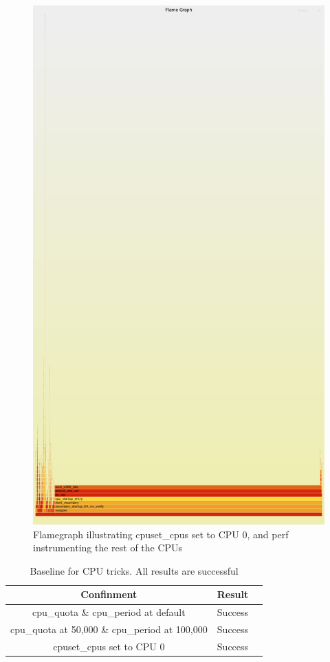 \documentclass{report}  %
\begin{document}
\begin{figure}[H]
    \centering
    \includegraphics[scale=0.2]{cpu_tricks/6.1.0/V1/flamegraph_20241021_080829.png}
    \caption{Flamegraph illustrating cpuset\_cpus set to CPU 0, and perf instrumenting the rest of the CPUs}
    \label{fig:flamegraph}
\end{figure}


\begin{table}[h!]
\centering
\begin{tabular}{|c|c|c|}
\hline
Confinment & Result \\ \hline
cpu\_quota \& cpu\_period at default & Success \\ \hline
cpu\_quota at 50,000 \& cpu\_period at 100,000 & Success \\ \hline
cpuset\_cpus set to CPU 0 & Success \\ \hline
\end{tabular}
\caption{Baseline for CPU tricks. All results are successful}
\end{table}
\end{document}
